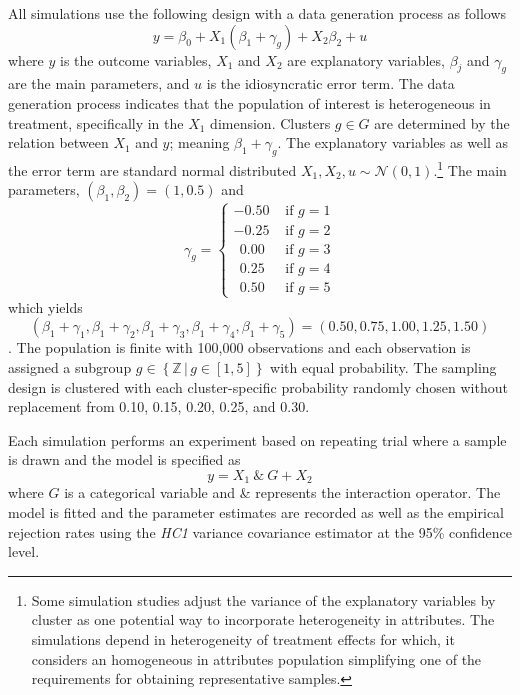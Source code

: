 \documentclass{jbsc}
\begin{document}
All simulations use the following design with a data generation process as follows
\begin{equation}
\label{model2}
y = \beta_{0} + X_{1} \left(\beta_{1} + \gamma_{g}\right) + X_{2} \beta_{2} + u
\end{equation}
where $y$ is the outcome variables, $X_{1}$ and $X_{2}$ are explanatory variables, $\beta_{j}$ and $\gamma_{g}$ are the main parameters, and $u$ is the idiosyncratic error term. The data generation process indicates that the population of interest is heterogeneous in treatment, specifically in the $X_{1}$ dimension. Clusters $g \in G$ are determined by the relation between $X_{1}$ and $y$; meaning $\beta_{1} + \gamma_{g}$. The explanatory variables as well as the error term are standard normal distributed $X_{1}, X_{2}, u \sim \mathcal{N}\left(0,1\right)$.\footnote{Some simulation studies adjust the variance of the explanatory variables by cluster as one potential way to incorporate heterogeneity in attributes. The simulations depend in heterogeneity of treatment effects for which, it considers an homogeneous in attributes population simplifying one of the requirements for obtaining representative samples.} The main parameters, $\left(\beta_{1}, \beta_{2}\right) = \left(1, 0.5\right)$ and
\begin{equation}
\gamma_{g} =
\begin{cases}
- 0.50 & \text{ if } g = 1\\
- 0.25 & \text{ if } g = 2\\
\ \ 0.00 & \text{ if } g = 3\\
\ \ 0.25 & \text{ if } g = 4\\
\ \ 0.50 & \text{ if } g = 5
\end{cases}
\end{equation}
which yields
\begin{equation*}
    \left(\beta_{1} + \gamma_{1}, \beta_{1} + \gamma_{2}, \beta_{1} + \gamma_{3}, \beta_{1} + \gamma_{4}, \beta_{1} + \gamma_{5}\right) = \left(0.50, 0.75, 1.00, 1.25, 1.50\right)
\end{equation*}.
The population is finite with 100,000 observations and each observation is assigned a subgroup $g \in \left\{\mathbb{Z}\,|\,g \in [1, 5]\right\}$ with equal probability. The sampling design is clustered with each cluster-specific probability randomly chosen without replacement from 0.10,	0.15, 0.20, 0.25, and 0.30.

Each simulation performs an experiment based on repeating trial where a sample is drawn and the model is specified as
\begin{equation}
y = X_{1}\ \&\ G + X_{2}
\end{equation}
where $G$ is a categorical variable and \& represents the interaction operator. The model is fitted and the parameter estimates are recorded as well as the empirical rejection rates using the \textit{HC1} \citep{Eicker_1967, Huber_1967, White_1980, MacKinnon_White_1985} variance covariance estimator at the 95\% confidence level.
\end{document}
